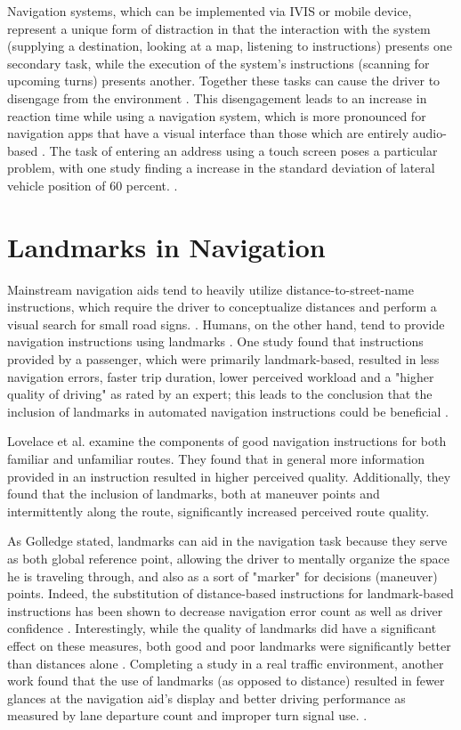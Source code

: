 Navigation systems, which can be implemented via IVIS or mobile device, represent a unique form of distraction in that the interaction with the system (supplying a destination, looking at a map, listening to instructions) presents one secondary task, while the execution of the system's instructions (scanning for upcoming turns) presents another. Together these tasks can cause the driver to disengage from the environment \cite{leshed2008car}. This disengagement leads to an increase in reaction time while using a navigation system, which is more pronounced for navigation apps that have a visual interface than those which are entirely audio-based \cite{harms2003peripheral}. The task of entering an address using a touch screen poses a particular problem, with one study finding a increase in the standard deviation of lateral vehicle position of 60 percent. \cite{tsimhoni2004address}.

\section{Landmarks in Navigation}

Mainstream navigation aids tend to heavily utilize distance-to-street-name instructions, which require the driver to conceptualize distances and perform a visual search for small road signs. \cite{burnett2000turn}. Humans, on the other hand, tend to provide navigation instructions using landmarks \cite{zaidel1997automatic}. One study found that instructions provided by a passenger, which were primarily landmark-based, resulted in less navigation errors, faster trip duration, lower perceived workload and a "higher quality of driving" as rated by an expert; this leads to the conclusion that the inclusion of landmarks in automated navigation instructions could be beneficial \cite{burnett1997assessment}. 

Lovelace et al. \cite{lovelace1999elements} examine the components of good navigation instructions for both familiar and unfamiliar routes.  They found that in general more information provided in an instruction resulted in higher perceived quality. Additionally, they found that the inclusion of landmarks, both at maneuver points and intermittently along the route, significantly increased perceived route quality.

As Golledge \cite{golledge2003human} stated, landmarks can aid in the navigation task because they serve as both global reference point, allowing the driver to mentally organize the space he is traveling through, and also as a sort of "marker" for decisions (maneuver) points. Indeed, the substitution of distance-based instructions for landmark-based instructions has been shown to decrease navigation error count as well as driver confidence \cite{may2005incorporating}. Interestingly, while the quality of landmarks did have a significant effect on these measures, both good and poor landmarks were significantly better than distances alone \cite{may2005incorporating}. Completing a study in a real traffic environment, another work found that the use of landmarks (as opposed to distance) resulted in fewer glances at the navigation aid's display and better driving performance as measured by lane departure count and improper turn signal use. \cite{may2006presence}.

